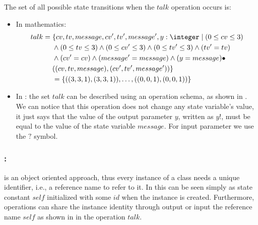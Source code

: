 The set of all possible state transitions when the $talk$ operation occurs is:
\begin{itemize}
\item In mathematics: 
\begin{equation*}
\begin{aligned}
talk ={} & \{cv,tv,message,cv',tv',message',y: \integer\mid (0 \leq  cv \leq 3) \\
      &  \wedge (0 \leq  tv \leq 3)\wedge (0 \leq  cv' \leq 3) \wedge (0 \leq  tv' \leq 3) \wedge (tv' = tv)  \\
      & \wedge (cv' = cv) \wedge (message' = message) \wedge (y = message)\bullet \\
      &  \pair{\tripple{cv}{tv}{message}}{\tripple{cv'}{tv'}{message'}}\} \\
      & =\{\pair{\tripple{3}{3}{1}}{\tripple{3}{3}{1}},\dots,\pair{\tripple{0}{0}{1}}{\tripple{0}{0}{1}}\}
\end{aligned}
\end{equation*}
\item In \oz{}: the set $talk$ can be described using an operation schema, as shown in . We can notice that this operation does not change any state variable's value, it just says that the value of the output parameter $y$, written as $y!$, must be equal to the value of the state variable $message$. For input parameter we use the $?$ symbol.

\end{itemize}

\subsubsection{:} 
\label{instance_reference} 
\oz{} is an object oriented approach, thus every instance of a class needs a unique identifier, i.e., a reference name to refer to it. In \oz{} this can be seen simply as state constant $self$ initialized with some $id$ when the instance is created. Furthermore, operations can share the instance identity through output or input the reference name $self$ as shown in  in the operation $talk$.
